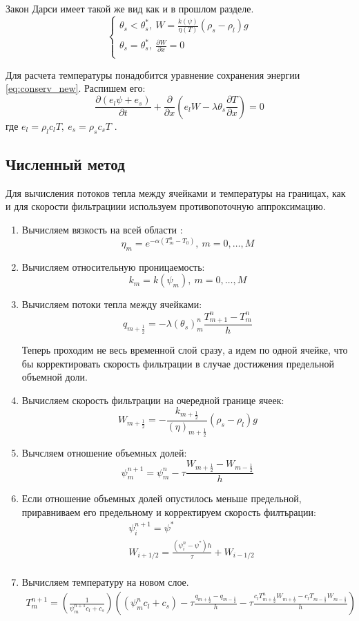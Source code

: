 \documentclass[12pt,a4paper]{article}
\newcommand{\pd}[2]{\frac{\partial #1}{\partial #2}}
\begin{document}
Закон Дарси имеет такой же вид как и в прошлом разделе.
$$
\begin{cases}
\theta_s < \theta_s^*,\  W = \frac{k(\psi)}{\eta(T)} (\rho_s - \rho_l) g\\
\theta_s = \theta_s^*,\  \pd{W}{x} = 0\\
\end{cases}
$$

Для расчета температуры понадобится уравнение сохранения энергии \eqref{eq:conserv_new}. Распишем его:	
$$
\pd{(e_l\psi+e_s)}{t} + \pd{}{x}(e_l W - \lambda\theta_s\pd{T}{x}) = 0
$$
где $ e_l = \rho_l c_l T,\ e_s = \rho_s c_s T $ .



\subsection{Численный метод}
Для вычисления потоков тепла между ячейками и температуры на границах, как и для скорости фильтрациии используем противопоточную аппроксимацию.
\begin{enumerate}
\item Вычисляем вязкость на всей области : 
$$
\eta_m = e^{-\alpha(T_m^n - T_{0})},\ m = 0, \dots ,M
$$
\item Вычисляем относительную проницаемость:
$$
k_m = k(\psi_m) , \ m = 0,  \dots ,M
$$
\item Вычисляем потоки тепла между ячейками:
$$
q_{m+\frac12} = - \lambda (\theta_{s})_m^{n} \frac{T_{m+1}^n - T_m^n}{h} 
$$

Теперь проходим не весь временной слой сразу, а идем по одной ячейке, что бы корректировать скорость фильтрации в случае достижения предельной объемной доли.
\item Вычисляем скорость фильтрации на очередной границе ячеек:
$$
W_{m+\frac12} = -\frac{k_{m+\frac12}}{(\eta)_{m+\frac12}}(\rho_s - \rho_l)g
$$
\item  Вычсляем отношение объемных долей:
$$
\psi_m^{n+1} = \psi_m^n - \tau \frac{W_{m+\frac12} - W_{m-\frac12}}{h}
$$
\item Если отношение объемных долей опустилось меньше предельной, приравниваем его предельному и корректируем скорость филтьрации:
$$
\begin{aligned}
&\psi_{i}^{n+1} = \psi^* \\
&W_{i+1/2} = \frac{(\psi_i^n - \psi^*)h}{\tau} + W_{i-1/2} \\
\end{aligned}
$$
\item Вычисляем температуру на новом слое. 
\begin{multline}
 T_m^{n+1} =  \left(\frac{1}{\psi_m^{n+1} c_l + c_s}\right)\left( (\psi_m^n  c_l + c_s)
- \tau\frac{q_{m+\frac12} - q_{m-\frac12}}{h} - \tau\frac{c_l T_{m+\frac12}^n W_{m+\frac12} - c_l T_{m-\frac12} W_{m-\frac12}}{h}\right)
\end{multline}
\end{enumerate}
\end{document}
